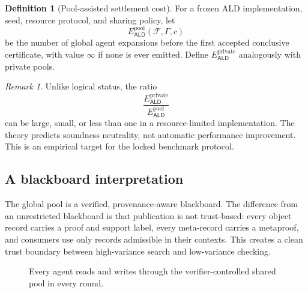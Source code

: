\documentclass[11pt]{article}
\theoremstyle{definition}
\newtheorem{definition}[theorem]{Definition}
\theoremstyle{remark}
\newtheorem{remark}[theorem]{Remark}
\newcommand{\Pool}{\mathcal L}
\newcommand{\MetaPool}{\mathcal K}
\newcommand{\ALD}{\mathsf{ALD}}
\newcommand{\M}{\mathcal M}
\newcommand{\F}{\mathcal F}
\newcommand{\Gammaa}{\Gamma}
\begin{document}
\begin{definition}[Pool-assisted settlement cost]
For a frozen ALD implementation, seed, resource protocol, and sharing policy, let
\[
E_{\ALD}^{\mathrm{pool}}(\F,\Gammaa,c)
\]
be the number of global agent expansions before the first accepted conclusive certificate, with value $\infty$ if none is ever emitted. Define $E_{\ALD}^{\mathrm{private}}$ analogously with private pools.
\end{definition}

\begin{remark}
Unlike logical status, the ratio
\[
\frac{E_{\ALD}^{\mathrm{private}}}{E_{\ALD}^{\mathrm{pool}}}
\]
can be large, small, or less than one in a resource-limited implementation. The theory predicts soundness neutrality, not automatic performance improvement. This is an empirical target for the locked benchmark protocol.
\end{remark}

\subsection{A blackboard interpretation}
The global pool is a verified, provenance-aware blackboard. The difference from an unrestricted blackboard is that publication is not trust-based: every object record carries a proof and support label, every meta-record carries a metaproof, and consumers use only records admissible in their contexts. This creates a clean trust boundary between high-variance search and low-variance checking.

\begin{figure}[ht]
\centering
{}
\caption{Every agent reads and writes through the verifier-controlled shared pool in every round.}
\end{figure}
\end{document}
